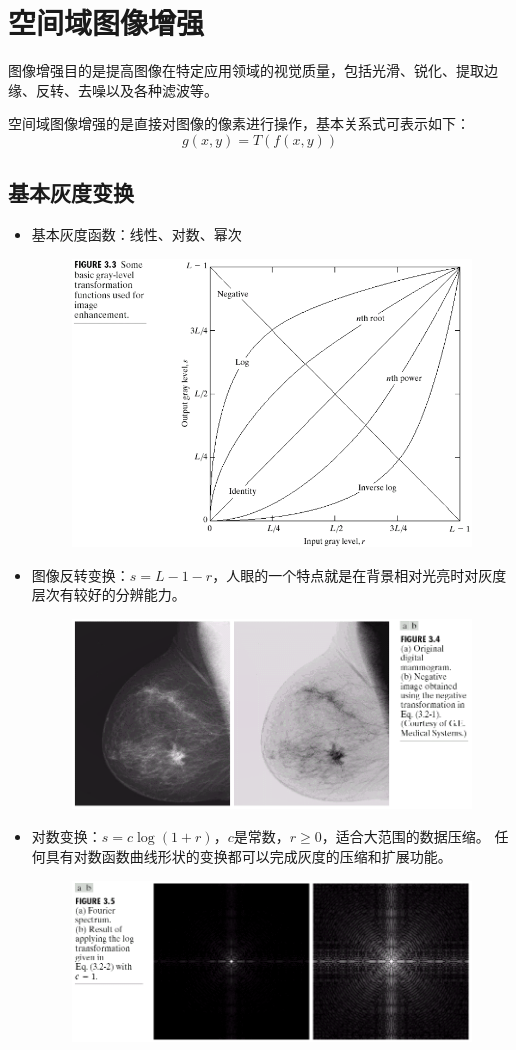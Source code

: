 
\section{空间域图像增强} %
图像增强目的是提高图像在特定应用领域的视觉质量，包括光滑、锐化、提取边缘、反转、去噪以及各种滤波等。

空间域图像增强的是直接对图像的像素进行操作，基本关系式可表示如下：
\[g(x,y)=T(f(x,y))\]

\subsection{基本灰度变换}
\begin{itemize}
\item 基本灰度函数：线性、对数、幂次
\begin{figure}[H]
\centering
\includegraphics[width=0.6\linewidth]{fig/enhancement.png}
\end{figure}
\item 图像反转变换：$s=L-1-r$，人眼的一个特点就是在背景相对光亮时对灰度层次有较好的分辨能力。
\begin{figure}[H]
\centering
\includegraphics[width=0.6\linewidth]{fig/trans-inverse.png}
\end{figure}
\item 对数变换：$s=c\log(1+r)$，$c$是常数，$r\geq 0$，适合大范围的数据压缩。
任何具有对数函数曲线形状的变换都可以完成灰度的压缩和扩展功能。 
\begin{figure}[H]
\centering
\includegraphics[width=0.6\linewidth]{fig/trans-log.png}

\end{figure}
\end{itemize}
